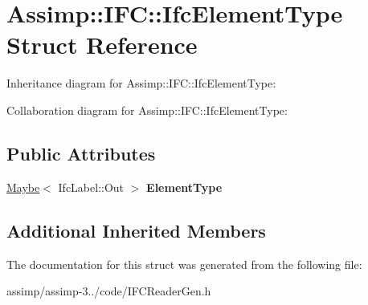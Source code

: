 \hypertarget{struct_assimp_1_1_i_f_c_1_1_ifc_element_type}{\section{Assimp\+:\+:I\+F\+C\+:\+:Ifc\+Element\+Type Struct Reference}
\label{struct_assimp_1_1_i_f_c_1_1_ifc_element_type}
}


Inheritance diagram for Assimp\+:\+:I\+F\+C\+:\+:Ifc\+Element\+Type\+:


Collaboration diagram for Assimp\+:\+:I\+F\+C\+:\+:Ifc\+Element\+Type\+:
\subsection*{Public Attributes}
\begin{DoxyCompactItemize}
\item 
\hypertarget{struct_assimp_1_1_i_f_c_1_1_ifc_element_type_a49b9326177c5937827fe1d0a8c7a6635}{\hyperlink{struct_assimp_1_1_s_t_e_p_1_1_maybe}{Maybe}$<$ Ifc\+Label\+::\+Out $>$ {\bfseries Element\+Type}}\label{struct_assimp_1_1_i_f_c_1_1_ifc_element_type_a49b9326177c5937827fe1d0a8c7a6635}

\end{DoxyCompactItemize}
\subsection*{Additional Inherited Members}


The documentation for this struct was generated from the following file\+:\begin{DoxyCompactItemize}
\item 
assimp/assimp-\/3../code/I\+F\+C\+Reader\+Gen.\+h\end{DoxyCompactItemize}
